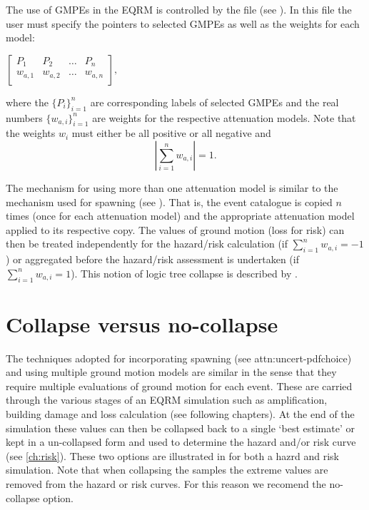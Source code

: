 The use of GMPEs in the EQRM is controlled by the
 file (see
). In this file the user must
specify the pointers to selected GMPEs as well as the weights for
each model:
\begin{center}
\begin{math}
 \left[ \begin{array}{ccccc}
P_1 & P_2 &  \hdots & P_n \\
w_{a,1} & w_{a,2} &  \hdots & w_{a,n} \\
\end{array} \right],
\end{math}
\end{center}
where the $\{P_i\}_{i=1}^n$ are corresponding labels of selected
GMPEs and the real numbers $\{w_{a,i}\}_{i=1}^n$ are weights for the
respective attenuation models. Note that the weights $w_i$ must
either be all positive or all negative and
\begin{equation}
\left|\sum_{i=1}^{n}w_{a,i}\right| = 1.
\end{equation}



The mechanism for using more than one attenuation model is similar
to the mechanism used for spawning (see
). That is, the event catalogue is
copied $n$ times (once for each attenuation model) and the
appropriate attenuation model applied to its respective copy. The
values of ground motion (loss for risk) can then be treated
independently for the hazard/risk calculation (if
$\sum_{i=1}^{n}w_{a,i} = -1$) or aggregated before the hazard/risk
assessment is undertaken (if $\sum_{i=1}^{n}w_{a,i} = 1$). This
notion of logic tree collapse is described by
.


\section{Collapse versus no-collapse}

The techniques adopted for incorporating spawning (see \sref
{attn:uncert-pdfchoice}) and using multiple ground motion models are
similar in the sense that they require multiple evaluations of
ground motion for each event. These are carried through the various
stages of an EQRM simulation such as amplification, building damage
and loss calculation (see following chapters). At the end of the
simulation these values can then be collapsed back to a single `best
estimate' or kept in a un-collapsed form and used to determine the
hazard and/or risk curve (see \cref{ch:risk}). These two options are
illustrated in  for both a hazrd and
risk simulation. Note that when collapsing the samples the extreme
values are removed from the hazard or risk curves. For this reason
we recomend the no-collapse option.

